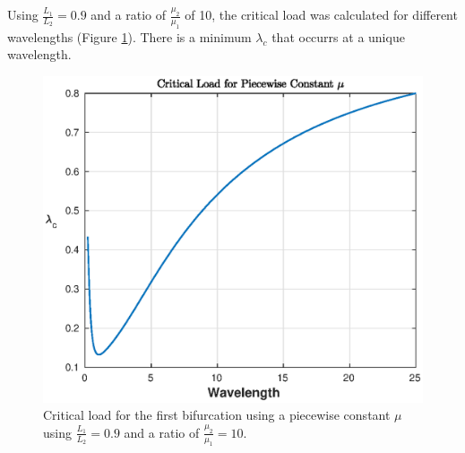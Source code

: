 \documentclass[11pt]{report}
\begin{document}
Using $\frac{L_1}{L_2} = 0.9$ and a ratio of $\frac{\mu_2}{\mu_1}$ of 10, the critical load was calculated for different wavelengths (Figure \ref{fig:piece_const_load}). There is a minimum $\lambda_c$ that occurrs at a unique wavelength.
\begin{figure}[!htb]
	\begin{center}
		\includegraphics[scale=0.7]{crit_load_muRat_10}
	\end{center}
	\captionsetup{format=hang}
	\caption{Critical load for the first bifurcation using a piecewise constant $\mu$ using $\frac{L_1}{L_2} = 0.9$ and a ratio of $\frac{\mu_2}{\mu_1} = 10$.}
	\label{fig:piece_const_load}
\end{figure}

\newpage
\end{document}
